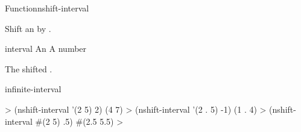 \documentclass[10pt,twoside,english,pdftex]{article}
\begin{document}
\begin{functiondoc}{Function}{nshift-interval}%
  {
    \returns{} }
%
%

\fnsyntax

\fnpurpose Shift an  by .

\fnpackage {}

\fnmodule {}

\fnargs
\begin{args}{interval}
\arg[interval] An 
\arg[amount] A number
\end{args}

\fnreturns The shifted .

\begin{alsos}{infinite-interval}
\end{alsos}

\fnexamples
%
\W\supp
\begin{example}
  > (nshift-interval '(2 5) 2)
  (4 7)
  > (nshift-interval '(2 . 5) -1)
  (1 . 4)
  > (nshift-interval #(2 5) .5)
  #(2.5 5.5)
  >
\end{example}

\end{functiondoc}

\end{document}
